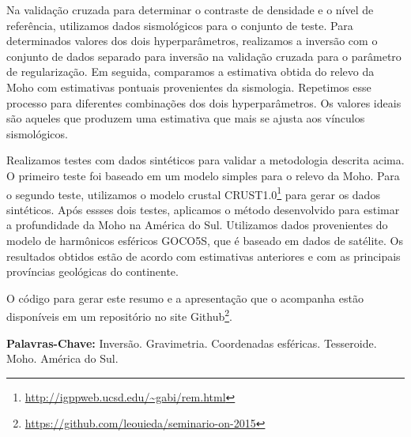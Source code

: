 \documentclass[12pt]{letter}
\begin{document}
Na validação cruzada para determinar o contraste de densidade e o nível de
referência, utilizamos dados sismológicos para o conjunto de teste.
Para determinados valores dos dois hyperparâmetros, realizamos a inversão com o
conjunto de dados separado para inversão na validação cruzada para o parâmetro
de regularização.
Em seguida, comparamos a estimativa obtida do relevo da Moho com estimativas
pontuais provenientes da sismologia.
Repetimos esse processo para diferentes combinações dos dois hyperparâmetros.
Os valores ideais são aqueles que produzem uma estimativa que mais se ajusta
aos vínculos sismológicos.

Realizamos testes com dados sintéticos para validar a metodologia descrita
acima.
O primeiro teste foi baseado em um modelo simples para o relevo da Moho.
Para o segundo teste, utilizamos o modelo crustal
CRUST1.0\footnote{\url{http://igppweb.ucsd.edu/~gabi/rem.html}}
para gerar os dados sintéticos.
Após essses dois testes, aplicamos o método desenvolvido para estimar a
profundidade da Moho na América do Sul.
Utilizamos dados provenientes do modelo de harmônicos esféricos GOCO5S, que é
baseado em dados de satélite.
Os resultados obtidos estão de acordo com estimativas anteriores e com as
principais províncias geológicas do continente.

O código para gerar este resumo
e a apresentação que o acompanha
estão disponíveis em um repositório no site
Github\footnote{\url{https://github.com/leouieda/seminario-on-2015}}.

\textbf{Palavras-Chave:}
Inversão. Gravimetria. Coordenadas esféricas. Tesseroide. Moho. América do Sul.
\end{document}
